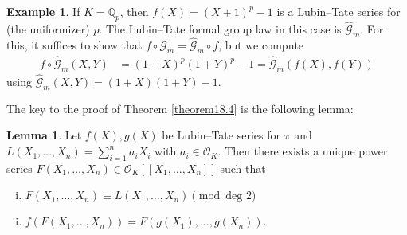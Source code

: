 \documentclass{article}
\theoremstyle{definition}
\newtheorem{lemma}[theorem]{Lemma}
\newtheorem{example}{Example}[section]
\begin{document}
\begin{example}
    If $K= \mathbb{Q}_p$, then $f(X) = (X+1)^p-1$ is a Lubin--Tate series for (the uniformizer) $p$. The Lubin--Tate formal group law in this case is $\hat{\mathcal{G}}_m$. For this, it suffices to show that $f \circ \hat{\mathcal{G}}_m = \hat{\mathcal{G}}_m \circ f$, but we compute 
    \begin{align*}
        f \circ \hat{\mathcal{G}}_m(X,Y) &= (1+X)^p(1+Y)^p-1 = \hat{\mathcal{G}}_m(f(X),f(Y))
    \end{align*}
    using $\hat{\mathcal{G}}_m(X,Y) = (1+X)(1+Y)-1$.
\end{example}
The key to the proof of Theorem \ref{theorem18.4} is the following lemma:
\begin{lemma}\label{lemma18.5}
    Let $f(X),g(X)$ be Lubin--Tate series for $\pi$ and $L(X_1,\ldots,X_n) = \sum_{i=1}^{n} a_i X_i$ with $a_i \in \mathcal{O}_K$. Then there exists a unique power series $F(X_1,\ldots,X_n) \in \mathcal{O}_K[[X_1,\ldots,X_n]]$ such that
    \begin{enumerate}[(i)]
        \item $F(X_1,\ldots,X_n) \equiv L(X_1,\ldots,X_n) \pmod{\text{deg }2}$
        \item $f(F(X_1,\ldots,X_n))  = F(g(X_1),\ldots, g(X_n))$.
    \end{enumerate}
\end{lemma}
\end{document}
